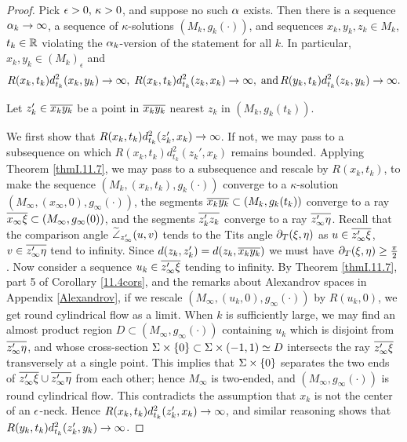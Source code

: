 \begin{proof}
Pick $\epsilon>0,\,\kappa>0$, and suppose no such $\alpha$ exists.  Then
there is a sequence $\alpha_k\rightarrow\infty$, a
sequence of $\kappa$-solutions $(M_k,g_k(\cdot))$,
and sequences $x_k,y_k,z_k\in M_k$, $t_k\in {\mathbb R}$ violating the $\alpha_k$-version
of the statement
for all $k$.  In particular, $x_k, y_k \in (M_k)_\epsilon$ and
\begin{equation}
R(x_k,t_k)d^2_{t_k}(x_k,y_k)\rightarrow\infty,\;
R(x_k,t_k)d^2_{t_k}(z_k,x_k)\rightarrow\infty,\;
\mbox{and}\,R(y_k,t_k)d^2_{t_k}(z_k,y_k)\rightarrow\infty.
\end{equation}

 Let $z_k'\in\overline{x_ky_k}$ be a point in $\overline{x_ky_k}$
nearest $z_k$ in $(M_k,g_k(t_k))$.



We first show that $R(x_k,t_k)d_{t_k}^2(z_k',x_k)\rightarrow\infty$.
If not, we may pass to a subsequence on which $R(x_k,t_k)d_{t_k}^2(z_k',x_k)$
remains bounded.   Applying Theorem \ref{thmI.11.7}, we may
pass to a subsequence and
rescale by $R(x_k,t_k)$,
to make the sequence $(M_k,(x_k,t_k),g_k(\cdot))$
converge to a $\kappa$-solution $(M_\infty,(x_\infty,0),g_\infty(\cdot))$,
the segments $\overline{x_ky_k}\subset (M_k,g_k(t_k))$
converge to a ray $\overline{x_\infty\xi}\subset (M_\infty,g_\infty(0))$,
and the segments $\overline{z_k'z_k}$ converge to
a ray $\overline{z_\infty'\eta}$.  Recall that the comparison angle
$\widetilde{\angle}_{z^\prime_\infty}(u,v)$ tends to the Tits angle
$\partial_T(\xi,\eta)$ as $u\in\overline{z_\infty'\xi}$, $v\in \overline{z_\infty'\eta}$
tend to infinity.  Since $d(z_k,z_k')=d(z_k,\overline{x_ky_k})$ we must
have $\partial_T(\xi,\eta)\geq\frac{\pi}{2}$.  Now consider a sequence
$u_k\in \overline{z_\infty'\xi}$ tending to infinity.  By
Theorem \ref{thmI.11.7}, part 5 of Corollary \ref{11.4cors},
and the remarks about Alexandrov spaces in Appendix \ref{Alexandrov},
if we rescale $(M_\infty,(u_k,0),g_\infty(\cdot))$ by $R(u_k,0)$,
we get round cylindrical flow as a limit.   When $k$ is sufficiently
large,
we may find an almost product region $D\subset (M_\infty,g_\infty(\cdot))$
containing $u_k$ which is disjoint from $\overline{z_\infty'\eta}$,
and whose cross-section $\Sigma\times\{0\}\subset\Sigma\times (-1,1)\simeq D$
intersects the ray $\overline{z_\infty'\xi}$ transversely at a single point.
This implies that $\Sigma\times \{0\}$ separates the two ends
of $\overline{z_\infty'\xi}\cup\overline{z_\infty'\eta}$ from each other; hence
$M_\infty$ is two-ended, and $(M_\infty,g_\infty(\cdot))$ is round
cylindrical flow.   This contradicts the assumption that
$x_k$ is not the center of
an $\epsilon$-neck.  Hence $R(x_k,t_k)d_{t_k}^2(z_k',x_k)\rightarrow\infty$,
and similar reasoning shows that $R(y_k,t_k)d_{t_k}^2(z_k',y_k)\rightarrow\infty$.


\end{proof}
